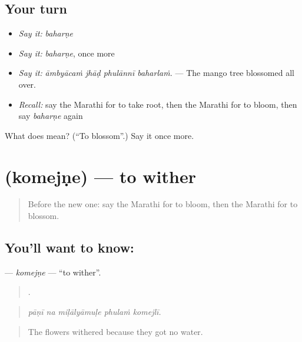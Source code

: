 \subsection*{Your turn}
\begin{itemize}
\raggedright
  \item \emph{Say it:} \emph{baharṇe}
  \item \emph{Say it:} \emph{baharṇe}, once more
  \item \emph{Say it:} \emph{āmbyācaṁ jhāḍ phulānnī baharlaṁ.} — The mango tree blossomed all over.
  \item \emph{Recall:} say the Marathi for to take root, then the Marathi for to bloom, then say \emph{baharṇe} again
\end{itemize}

\begin{tcolorbox}[breakable,colback=teal!4,colframe=teal!35!black,title={Before you move on}]
What does  mean? (\textquotedblleft{}To blossom\textquotedblright{}.) Say it once more.
\end{tcolorbox}
\section[\texorpdfstring{\mr{कोमेजणे} (komejṇe)}{कोमेजणे (komejṇe)}]{ (komejṇe) — to wither}

\label{lesson:MR-C445-komejne}



\begin{quote}
Before the new one: say the Marathi for to bloom, then the Marathi for to blossom.
\end{quote}

\subsection*{You'll want to know: }
\textbf{} — \emph{komejṇe} — \textquotedblleft{}to wither\textquotedblright{}.

\begin{quote}
    .
\end{quote}

\begin{quote}
\emph{pāṇī na miḷālyāmuḷe phulaṁ komejlī.}
\end{quote}

\begin{quote}
The flowers withered because they got no water.
\end{quote}

